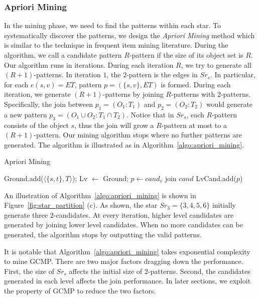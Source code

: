 \subsubsection{Apriori Mining}
In the mining phase, we need to find the patterns within each star. 
To systematically discover the patterns, we design the \emph{Apriori Mining} method which
is similar to the technique in frequent item mining literature. During the algorithm, we call a candidate pattern $R$-pattern if the size of its object set is $R$. 
Our algorithm runs in iterations. During each iteration $R$, we try to generate all $(R+1)$-patterns. In iteration $1$, the $2$-pattern is the edges in $Sr_s$. In particular,
for each $e(s,v)=ET$, pattern $p=(\{s,v\}, ET)$ is formed. During each iteration, 
we generate $(R+1)$-patterns by joining $R$-patterns with $2$-patterns. Specifically,
the join between $p_1=(O_1:T_1)$ and $p_2=(O_2:T_2)$ would generate a new pattern $p_3=(O_1 \cup O_2:T_1 \cap T_2)$. Notice that in $Sr_s$, each $R$-pattern consists of the object $s$, thus the join will grow a $R$-pattern at most to a $(R+1)$-pattern.
Our mining algorithm stops where no further patterns are generated. The algorithm is illustrated as in Algorithm~\ref{algo:apriori_mining}.

\begin{algorithm}
\caption{Apriori Mining}
\label{algo:apriori_mining}
\begin{algorithmic}[1]
\State Ground.add($\langle \{s,t\}, T \rangle$);
\State Lv $\gets$ Ground;
\EndFor
{}
				\State $p \gets cand_v$ join $cand$
					\State LvCand.add($p$)
				\EndIf
			\EndFor
		\EndFor
	\Else
	\EndIf
\EndWhile
\end{algorithmic}
\end{algorithm}

An illustration of Algorithm~\ref{algo:apriori_mining} is shown in Figure~\ref{fig:star_partition} (c).
As shown, the star $Sr_3=\{3,4,5,6\}$ initially generate three $2$-candidates. At every iteration, 
higher level candidates are generated by joining lower level candidates. When no more candidates 
can be generated, the algorithm stops by outputting the valid patterns.

It is notable that Algorithm~\ref{algo:apriori_mining} takes exponential complexity to mine GCMP. There
are two major factors dragging down the performance. First, the size of $Sr_s$ affects
the initial size of $2$-patterns. Second, the candidates generated in each level affects the join performance. In later
sections, we exploit the property of GCMP to reduce the two factors.
